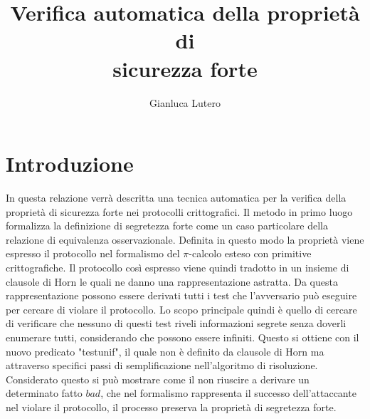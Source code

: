 \documentclass[12pt]{article}
\title{Verifica automatica della proprietà di\\ sicurezza forte}
\author{Gianluca Lutero}
\date{}
\begin{document}
\maketitle
\thispagestyle{empty}

\newpage
\section*{Introduzione}
In questa relazione verrà descritta una tecnica automatica per la verifica della proprietà di sicurezza forte nei protocolli crittografici. Il metodo in primo luogo formalizza la definizione di segretezza forte come un caso particolare della relazione di equivalenza osservazionale. Definita in questo modo la proprietà viene espresso il protocollo nel formalismo del $\pi$-calcolo esteso con primitive crittografiche. Il protocollo così espresso viene quindi tradotto in un insieme di clausole di Horn le quali ne danno una rappresentazione astratta. Da questa rappresentazione possono essere derivati tutti i test che l'avversario può eseguire per cercare di violare il protocollo. Lo scopo principale quindi è quello di cercare di verificare che nessuno di questi test riveli informazioni segrete senza doverli enumerare tutti, considerando che possono essere infiniti. Questo si ottiene con il nuovo predicato "testunif", il quale non è definito da clausole di Horn ma attraverso specifici passi di semplificazione nell'algoritmo di risoluzione. Considerato questo si può mostrare come il non riuscire a derivare un determinato fatto $bad$, che nel formalismo rappresenta il successo dell'attaccante nel violare il protocollo, il processo preserva la proprietà di segretezza forte.

\newpage
\end{document}
